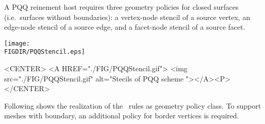 A PQQ reinement host requires three geometry policies for closed 
surfaces (i.e.~surfaces without boundaries):  a vertex-node stencil 
of a source vertex, an edge-node stencil of a source edge, and a 
facet-node stencil of a source facet.

\begin{ccTexOnly}
  \begin{center}
    \parbox{0.5\textwidth}{%
      \texttt{[image: \\FIGDIR/PQQStencil.eps]}%
    }
  \end{center}
\end{ccTexOnly}

\begin{ccHtmlOnly}
  <CENTER>
  <A HREF="./FIG/PQQStencil.gif">
     <img src="./FIG/PQQStencil.gif" alt="Stecils of PQQ scheme "></A><P>
  </CENTER>
\end{ccHtmlOnly}

Following shows the realization of the \CC\ rules as geometry policy class.
To support meshes with boundary, an additional policy for 
border vertices is required.

